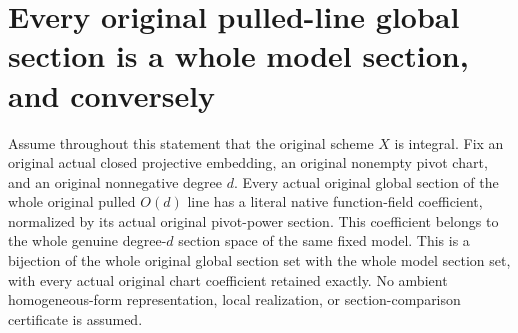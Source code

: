 \section{Every original pulled-line global section is a whole model section, and conversely}
\label{sec:native-pulled-projective-model-sections}

\begin{theorem}
\label{thm:native-pulled-projective-model-sections}
\leanok
{}
Assume throughout this statement that the original scheme $X$ is integral.
Fix an original actual closed projective embedding, an original nonempty
pivot chart, and an original nonnegative degree $d$. Every actual original
global section of the whole original pulled $O(d)$ line has a literal native
function-field coefficient, normalized by its actual original pivot-power
section. This coefficient belongs to the whole genuine degree-$d$ section
space of the same fixed model. This is a bijection of the whole original
global section set with the whole model section set, with every actual
original chart coefficient retained exactly. No ambient homogeneous-form
representation, local realization, or section-comparison certificate is
assumed.
\end{theorem}
